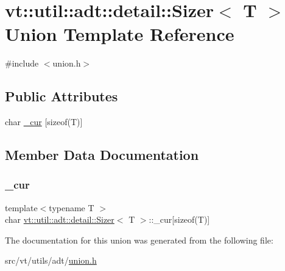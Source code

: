 \hypertarget{unionvt_1_1util_1_1adt_1_1detail_1_1_sizer_3_01_t_01_4}{}\section{vt\+:\+:util\+:\+:adt\+:\+:detail\+:\+:Sizer$<$ T $>$ Union Template Reference}
\label{unionvt_1_1util_1_1adt_1_1detail_1_1_sizer_3_01_t_01_4}


{\ttfamily \#include $<$union.\+h$>$}

\subsection*{Public Attributes}
\begin{DoxyCompactItemize}
\item 
char \hyperlink{unionvt_1_1util_1_1adt_1_1detail_1_1_sizer_3_01_t_01_4_a7ca91bcf14c50fcf19feaafd673d7d60}{\+\_\+cur} \mbox{[}sizeof(T)\mbox{]}
\end{DoxyCompactItemize}


\subsection{Member Data Documentation}
\mbox{\label{unionvt_1_1util_1_1adt_1_1detail_1_1_sizer_3_01_t_01_4_a7ca91bcf14c50fcf19feaafd673d7d60}} 
\subsubsection{\texorpdfstring{\+\_\+cur}{\_cur}}
{\footnotesize\ttfamily template$<$typename T $>$ \\
char \hyperlink{unionvt_1_1util_1_1adt_1_1detail_1_1_sizer}{vt\+::util\+::adt\+::detail\+::\+Sizer}$<$ T $>$\+::\+\_\+cur\mbox{[}sizeof(T)\mbox{]}}



The documentation for this union was generated from the following file\+:\begin{DoxyCompactItemize}
\item 
src/vt/utils/adt/\hyperlink{union_8h}{union.\+h}\end{DoxyCompactItemize}
